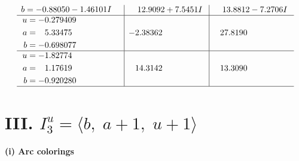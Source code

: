\documentclass[1p]{elsarticle_modified}
\theoremstyle{definition}
\begin{document}
$$\begin{array}{c|c|c}
\begin{aligned}
b &= -0.88050 - 1.46101 I\end{aligned}
 & \phantom{-}12.9092 + 7.5451 I & \phantom{-}13.8812 - 7.2706 I \\ \hline\begin{aligned}
u &= -0.279409\phantom{ +0.000000I} \\
a &= \phantom{-}5.33475\phantom{ +0.000000I} \\
b &= -0.698077\phantom{ +0.000000I}\end{aligned}
 & -2.38362\phantom{ +0.000000I} & \phantom{-}27.8190\phantom{ +0.000000I} \\ \hline\begin{aligned}
u &= -1.82774\phantom{ +0.000000I} \\
a &= \phantom{-}1.17619\phantom{ +0.000000I} \\
b &= -0.920280\phantom{ +0.000000I}\end{aligned}
 & \phantom{-}14.3142\phantom{ +0.000000I} & \phantom{-}13.3090\phantom{ +0.000000I}\\
 \hline 
 \end{array}$$\newpage\newpage\renewcommand{\arraystretch}{1}
\centering \section*{III. $I^u_{3}= \langle b,\;a+1,\;u+1 \rangle$}
\flushleft \textbf{(i) Arc colorings}\\
\end{document}
